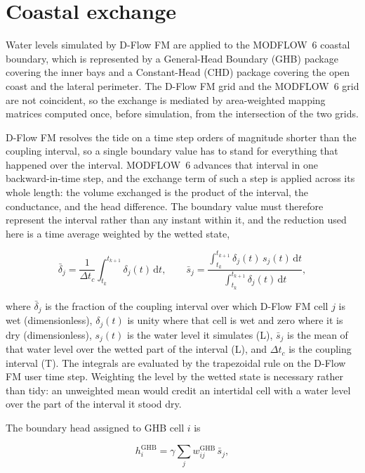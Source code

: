 \documentclass[preprint,authoryear,11pt]{elsarticle}
\begin{document}
\section{Coastal exchange}

Water levels simulated by D-Flow FM are applied to the MODFLOW~6 coastal boundary, which is represented by a General-Head Boundary (GHB) package covering the inner bays and a Constant-Head (CHD) package covering the open coast and the lateral perimeter. The D-Flow FM grid and the MODFLOW~6 grid are not coincident, so the exchange is mediated by area-weighted mapping matrices computed once, before simulation, from the intersection of the two grids.

D-Flow FM resolves the tide on a time step orders of magnitude shorter than the coupling interval, so a single boundary value has to stand for everything that happened over the interval. MODFLOW~6 advances that interval in one backward-in-time step, and the exchange term of such a step is applied across its whole length: the volume exchanged is the product of the interval, the conductance, and the head difference. The boundary value must therefore represent the interval rather than any instant within it, and the reduction used here is a time average weighted by the wetted state,

\begin{equation}
  \bar{\delta}_{j} = \frac{1}{\Delta t_{c}}
      \int_{t_{k}}^{t_{k+1}} \delta_{j}(t) \, \mathrm{d}t ,
  \qquad
  \bar{s}_{j} = \frac{\int_{t_{k}}^{t_{k+1}} \delta_{j}(t) \, s_{j}(t) \,
      \mathrm{d}t}{\int_{t_{k}}^{t_{k+1}} \delta_{j}(t) \, \mathrm{d}t} ,
  \label{eq:tmean}
\end{equation}

\noindent where $\bar{\delta}_{j}$ is the fraction of the coupling interval over which D-Flow FM cell $j$ is wet (dimensionless), $\delta_{j}(t)$ is unity where that cell is wet and zero where it is dry (dimensionless), $s_{j}(t)$ is the water level it simulates (L), $\bar{s}_{j}$ is the mean of that water level over the wetted part of the interval (L), and $\Delta t_{c}$ is the coupling interval (T). The integrals are evaluated by the trapezoidal rule on the D-Flow FM user time step. Weighting the level by the wetted state is necessary rather than tidy: an unweighted mean would credit an intertidal cell with a water level over the part of the interval it stood dry.

The boundary head assigned to GHB cell $i$ is

\begin{equation}
  h_{i}^{\mathrm{GHB}} = \gamma \sum_{j} w_{ij}^{\mathrm{GHB}} \, \bar{s}_{j} ,
  \label{eq:ghbhead}
\end{equation}
\end{document}
